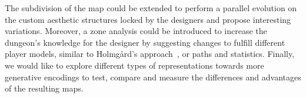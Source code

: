 
The subdivision of the map could be extended to perform a parallel evolution on the custom aesthetic structures locked by the designers and propose interesting variations. Moreover, a zone analysis could be introduced to increase the dungeon's knowledge for the designer by suggesting changes to fulfill different player models, similar to Holmg\r{a}rd's approach~\cite{Holmgard2014EvolvingModeling}, or paths and statistics. Finally, we would like to explore different types of representations towards more generative encodings to test, compare and measure the differences and advantages of the resulting maps.

